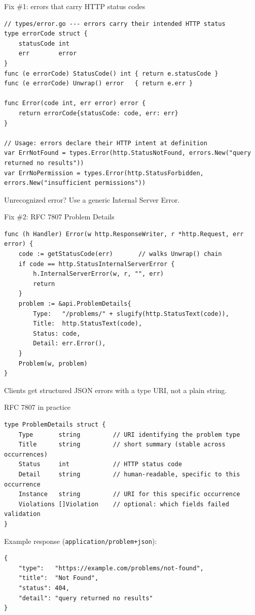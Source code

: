 \documentclass[aspectratio=169,11pt]{beamer}
\begin{document}
\begin{frame}[fragile]{Fix \#1: errors that carry HTTP status codes}
\begin{lstlisting}
// types/error.go --- errors carry their intended HTTP status
type errorCode struct {
	statusCode int
	err        error
}
func (e errorCode) StatusCode() int { return e.statusCode }
func (e errorCode) Unwrap() error   { return e.err }

func Error(code int, err error) error {
	return errorCode{statusCode: code, err: err}
}

// Usage: errors declare their HTTP intent at definition
var ErrNotFound = types.Error(http.StatusNotFound, errors.New("query returned no results"))
var ErrNoPermission = types.Error(http.StatusForbidden, errors.New("insufficient permissions"))
\end{lstlisting}
\alert{Unrecognized error? Use a generic Internal Server Error.}
\end{frame}

\begin{frame}[fragile]{Fix \#2: RFC 7807 Problem Details}
\begin{lstlisting}
func (h Handler) Error(w http.ResponseWriter, r *http.Request, err error) {
	code := getStatusCode(err)       // walks Unwrap() chain
	if code == http.StatusInternalServerError {
		h.InternalServerError(w, r, "", err)
		return
	}
	problem := &api.ProblemDetails{
		Type:   "/problems/" + slugify(http.StatusText(code)),
		Title:  http.StatusText(code),
		Status: code,
		Detail: err.Error(),
	}
	Problem(w, problem)
}
\end{lstlisting}
  \vspace{2pt}
  {\small Clients get structured JSON errors with a type URI, not a plain string.}
\end{frame}

\begin{frame}[fragile]{RFC 7807 in practice}
\begin{lstlisting}
type ProblemDetails struct {
	Type       string         // URI identifying the problem type
	Title      string         // short summary (stable across occurrences)
	Status     int            // HTTP status code
	Detail     string         // human-readable, specific to this occurrence
	Instance   string         // URI for this specific occurrence
	Violations []Violation    // optional: which fields failed validation
}
\end{lstlisting}

  \vspace{4pt}
  Example response (\texttt{application/problem+json}):
\begin{lstlisting}
{
    "type":   "https://example.com/problems/not-found",
    "title":  "Not Found",
    "status": 404,
    "detail": "query returned no results"
}
\end{lstlisting}
\end{frame}
\end{document}
